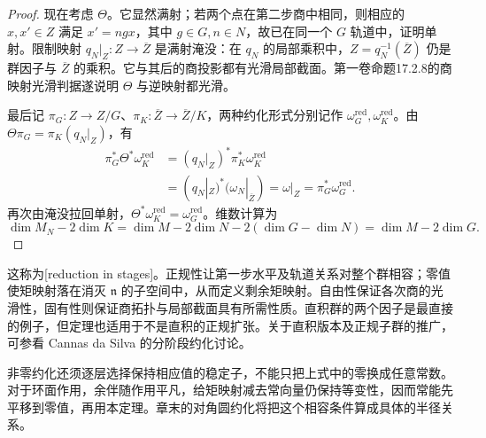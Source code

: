 \begin{proof}
	现在考虑 \(\Theta\)。它显然满射；若两个点在第二步商中相同，则相应的 \(x,x'\in Z\) 满足 \(x'=ngx\)，其中 \(g\in G,n\in N\)，故已在同一个 \(G\) 轨道中，证明单射。限制映射 \(q_N|_Z:Z\to\overline Z\) 是满射淹没：在 \(q_N\) 的局部乘积中，\(Z=q_N^{-1}(\overline Z)\) 仍是群因子与 \(\overline Z\) 的乘积。它与其后的商投影都有光滑局部截面。第一卷命题17.2.8的商映射光滑判据遂说明 \(\Theta\) 与逆映射都光滑。

	最后记 \(\pi_G:Z\to Z/G\)、\(\pi_K:\overline Z\to\overline Z/K\)，两种约化形式分别记作 \(\omega_G^{\mathrm{red}},\omega_K^{\mathrm{red}}\)。由
	\(\Theta\pi_G=\pi_K(q_N|_Z)\)，有
	\[
		\begin{aligned}
			\pi_G^*\Theta^*\omega_K^{\mathrm{red}}
			&=(q_N|_Z)^*\pi_K^*\omega_K^{\mathrm{red}}\\
			&=(q_N|_Z)^*(\omega_N|_{\overline Z})
			=\omega|_Z
			=\pi_G^*\omega_G^{\mathrm{red}}.
		\end{aligned}
	\]
	再次由淹没拉回单射，\(\Theta^*\omega_K^{\mathrm{red}}=\omega_G^{\mathrm{red}}\)。维数计算为
	\[
		\dim M_N-2\dim K
		=\dim M-2\dim N-2(\dim G-\dim N)
		=\dim M-2\dim G.
	\]
\end{proof}

这称为[reduction in stages]。正规性让第一步水平及轨道关系对整个群相容；零值使矩映射落在消灭 \(\mathfrak n\) 的子空间中，从而定义剩余矩映射。自由性保证各次商的光滑性，固有性则保证商拓扑与局部截面具有所需性质。直积群的两个因子是最直接的例子，但定理也适用于不是直积的正规扩张。关于直积版本及正规子群的推广，可参看 Cannas da Silva 的分阶段约化讨论。\cite[第6.2节，第163--164页]{Cannas2006Symplectic}

\ProseParagraphBreak

非零约化还须逐层选择保持相应值的稳定子，不能只把上式中的零换成任意常数。对于环面作用，余伴随作用平凡，给矩映射减去常向量仍保持等变性，因而常能先平移到零值，再用本定理。章末的对角圆约化将把这个相容条件算成具体的半径关系。
